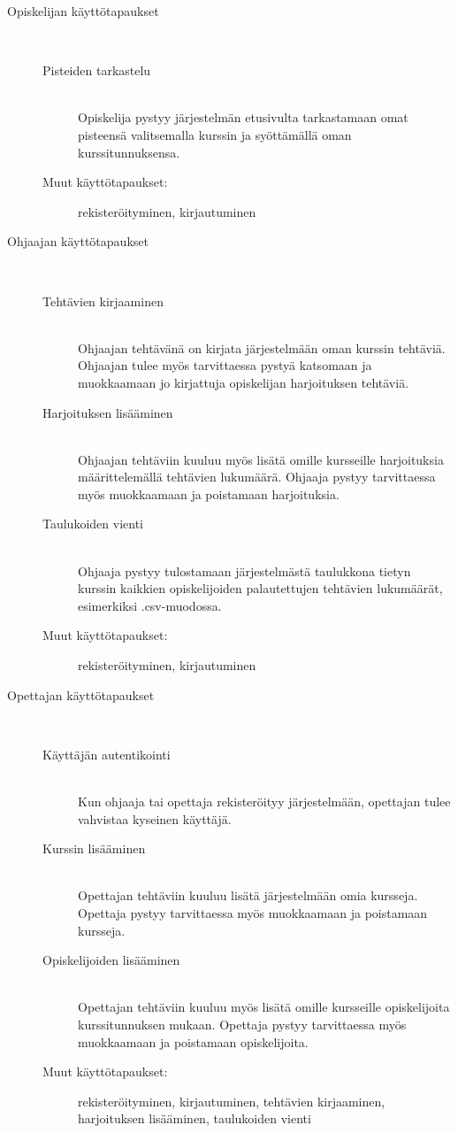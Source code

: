 \documentclass[a4paper,12pt, titlepage]{article}
\begin{document}
\begin{description}
	\item[Opiskelijan käyttötapaukset] \hfill \\
	\begin{description}
		\item[Pisteiden tarkastelu] \hfill \\
		Opiskelija pystyy järjestelmän etusivulta tarkastamaan
		omat pisteensä valitsemalla kurssin ja syöttämällä
		oman kurssitunnuksensa.
		\item[Muut käyttötapaukset:] rekisteröityminen, kirjautuminen
	\end{description}
	\item[Ohjaajan käyttötapaukset] \hfill \\
	\begin{description}
		\item[Tehtävien kirjaaminen] \hfill \\
		Ohjaajan tehtävänä on kirjata järjestelmään oman kurssin tehtäviä.
		Ohjaajan tulee myös tarvittaessa pystyä katsomaan ja muokkaamaan
		jo kirjattuja opiskelijan harjoituksen tehtäviä.
		\item[Harjoituksen lisääminen] \hfill \\
		Ohjaajan tehtäviin kuuluu myös lisätä omille kursseille harjoituksia
		määrittelemällä tehtävien lukumäärä. Ohjaaja pystyy tarvittaessa
		myös muokkaamaan ja poistamaan harjoituksia.
		\item[Taulukoiden vienti] \hfill \\
		Ohjaaja pystyy tulostamaan järjestelmästä taulukkona tietyn kurssin
		kaikkien opiskelijoiden palautettujen tehtävien lukumäärät, esimerkiksi
		.csv-muodossa.
		\item[Muut käyttötapaukset:] rekisteröityminen, kirjautuminen
	\end{description}
	\item[Opettajan käyttötapaukset] \hfill \\
	\begin{description}
		\item[Käyttäjän autentikointi] \hfill \\
		Kun ohjaaja tai opettaja rekisteröityy järjestelmään,
		opettajan tulee vahvistaa kyseinen käyttäjä.
		\item[Kurssin lisääminen] \hfill \\
		Opettajan tehtäviin kuuluu lisätä järjestelmään omia kursseja.
		Opettaja pystyy tarvittaessa myös muokkaamaan ja poistamaan kursseja.
		\item[Opiskelijoiden lisääminen] \hfill \\
		Opettajan tehtäviin kuuluu myös lisätä omille kursseille opiskelijoita
		kurssitunnuksen mukaan. Opettaja pystyy tarvittaessa myös muokkaamaan
		ja poistamaan opiskelijoita.
		\item[Muut käyttötapaukset:] rekisteröityminen, kirjautuminen,
		tehtävien kirjaaminen, harjoituksen lisääminen, taulukoiden vienti
	\end{description}
\end{description}
\end{document}
